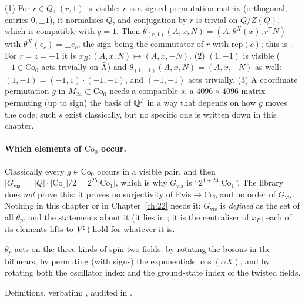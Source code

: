 \begin{example}\label{ch21:ex:visible}
(1) For $r\in Q$, $(r,1)$ is visible: $r$ is a signed permutation matrix (orthogonal, entries $0,\pm1$),
it normalises $Q$, and conjugation by $r$ is trivial on $Q/Z(Q)$, which is compatible with $g=1$.  Then
$\theta_{(r,1)}(A,x,N)=(A,\theta^X(x),r^{\mathsf T}N)$ with $\theta^X(e_c)=\pm e_c$, the sign being the
commutator of $r$ with $\mathrm{rep}(c)$; this is .  For $r=z=-1$ it is
$x_B:(A,x,N)\mapsto(A,x,-N)$.  (2) $(1,-1)$ is visible ($-1\in\mathrm{Co}_0$ acts trivially on
$\bar{\Lambda}$) and $\theta_{(1,-1)}(A,x,N)=(A,x,-N)$ as well: $(1,-1)=(-1,1)\cdot(-1,-1)$, and $(-1,-1)$ acts
trivially.  (3) A coordinate permutation $g$ in $M_{24}\subset\mathrm{Co}_0$ needs a compatible $s$, a
$4096\times4096$ matrix permuting (up to sign) the basis of ${\mathbb{Q}}^I$ in a way that depends on how $g$ moves
the code; such $s$ exist classically, but no specific one is written down in this chapter.
\end{example}

\paragraph{Which elements of $\mathrm{Co}_0$ occur.}  Classically every $g\in\mathrm{Co}_0$ occurs in a
visible pair, and then $|G_{\mathrm{vis}}|=|Q|\cdot|\mathrm{Co}_0|/2=2^{25}|\mathrm{Co}_1|$, which is why
$G_{\mathrm{vis}}$ is ``$2^{1+24}.\mathrm{Co}_1$''.  The library does \emph{not} prove this: it proves no
surjectivity of $\mathrm{Pvis}\to\mathrm{Co}_0$ and no order of $G_{\mathrm{vis}}$.  Nothing in this chapter
or in Chapter~\ref{ch:22} needs it: $G_{\mathrm{vis}}$ is \emph{defined} as the set of all $\theta_p$, and
the statements about it (it lies in ; it is the centraliser of $x_B$; each of its elements lifts
to ${V^{\natural}}$) hold for whatever it is.
\begin{physics}
$\theta_p$ acts on the three kinds of spin-two fields: by rotating the bosons in the bilinears, by
permuting (with signs) the exponentials $\cos(\alpha X)$, and by rotating both the oscillator index and
the ground-state index of the twisted fields.
\end{physics}
\begin{status}
Definitions, verbatim; ,  audited in .
\end{status}


